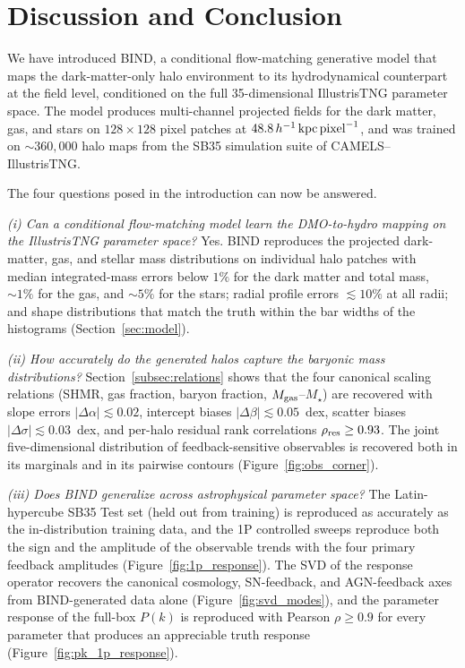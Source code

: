 \documentclass[linenumbers,trackchanges, twocolumn]{aastex701}
\begin{document}
\section{Discussion and Conclusion}
\label{sec:discussion}

We have introduced \textsc{BIND}, a conditional flow-matching generative model that maps the dark-matter-only halo environment to its hydrodynamical counterpart at the field level, conditioned on the full 35-dimensional IllustrisTNG parameter space. The model produces multi-channel projected fields for the dark matter, gas, and stars on $128\times128$ pixel patches at $48.8\,h^{-1}\,{\rm kpc}\,{\rm pixel}^{-1}$, and was trained on $\sim\!360{,}000$ halo maps from the SB35 simulation suite of CAMELS--IllustrisTNG.

The four questions posed in the introduction can now be answered.

\emph{(i) Can a conditional flow-matching model learn the DMO-to-hydro mapping on the IllustrisTNG parameter space?} Yes. \textsc{BIND} reproduces the projected dark-matter, gas, and stellar mass distributions on individual halo patches with median integrated-mass errors below $1\%$ for the dark matter and total mass, $\sim\!1\%$ for the gas, and $\sim\!5\%$ for the stars; radial profile errors $\lesssim 10\%$ at all radii; and shape distributions that match the truth within the bar widths of the histograms (Section~\ref{sec:model}).

\emph{(ii) How accurately do the generated halos capture the baryonic mass distributions?} Section~\ref{subsec:relations} shows that the four canonical scaling relations (SHMR, gas fraction, baryon fraction, $M_{\rm gas}$--$M_\star$) are recovered with slope errors $|\Delta\alpha|\lesssim 0.02$, intercept biases $|\Delta\beta|\lesssim 0.05$~dex, scatter biases $|\Delta\sigma|\lesssim 0.03$~dex, and per-halo residual rank correlations $\rho_{\rm res}\geq 0.93$. The joint five-dimensional distribution of feedback-sensitive observables is recovered both in its marginals and in its pairwise contours (Figure~\ref{fig:obs_corner}).

\emph{(iii) Does BIND generalize across astrophysical parameter space?} The Latin-hypercube SB35 Test set (held out from training) is reproduced as accurately as the in-distribution training data, and the 1P controlled sweeps reproduce both the sign and the amplitude of the observable trends with the four primary feedback amplitudes (Figure~\ref{fig:1p_response}). The SVD of the response operator recovers the canonical cosmology, SN-feedback, and AGN-feedback axes from \textsc{BIND}-generated data alone (Figure~\ref{fig:svd_modes}), and the parameter response of the full-box $P(k)$ is reproduced with Pearson $\rho\geq 0.9$ for every parameter that produces an appreciable truth response (Figure~\ref{fig:pk_1p_response}).
\end{document}
